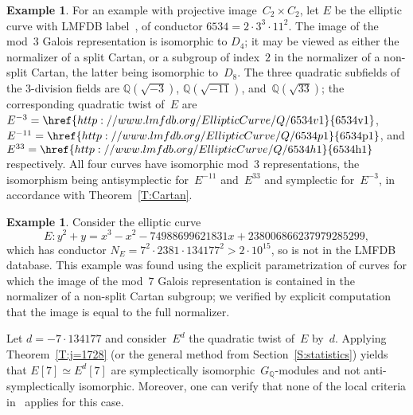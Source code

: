 \documentclass[12pt, reqno]{amsart}
\newcommand{\lmfdbec}[3]{\href{http://www.lmfdb.org/EllipticCurve/Q/#1#2#3}{{\text{\rm#1#2#3}}}}
\newcommand{\Q}{\mathbb{Q}}
\newcommand{\vv}{\upsilon}
\numberwithin{equation}{section}
\theoremstyle{definition}
\newtheorem{example}[theorem]{Example}
\theoremstyle{remark}
\begin{document}
\begin{example} \label{Ex:3twists}
  For an example with projective image~$C_2\times C_2$,
  let $E$ be the elliptic curve with LMFDB label~\lmfdbec{6534}{a}{1},
  of conductor $6534=2\cdot3^3\cdot11^2$.  The image of the mod~$3$
  Galois representation is isomorphic to $D_4$; it may be viewed as
  either the normalizer of a split Cartan, or a subgroup of index~$2$
  in the normalizer of a non-split Cartan, the latter being isomorphic
  to~$D_8$.  The three quadratic subfields of the $3$-division fields
  are $\Q(\sqrt{-3})$, $\Q(\sqrt{-11})$, and~$\Q(\sqrt{33})$; the
  corresponding quadratic twist of~$E$ are
  $E^{-3}=\lmfdbec{6534}{v}{1}$, $E^{-11}=\lmfdbec{6534}{p}{1}$, and
  $E^{33}=\lmfdbec{6534}{h}{1}$ respectively.  All four curves have
  isomorphic mod~$3$ representations, the isomorphism being
  antisymplectic for~$E^{-11}$ and~$E^{33}$ and symplectic
  for~$E^{-3}$, in accordance with Theorem~\ref{T:Cartan}.

\begin{comment}
  \textbf{We no longer need the following, since the new version of
    Theorem~\ref{T:Cartan} says that the symplectic twist is the one
    by $3^*=-3$!}
  
  The conclusion on the symplectic types follows from part 2) of Theorem~\ref{T:Cartan} once we show
  that $E[3]$ and $E^{-3}[3]$ are symplectically isomorphic. We will show this by applying \cite[Theorem~5]{FKSym} with $\ell = 11$. We use the notation of {\it loc. cit.}. Write $E' = E^{-3}$. The curves $E/\Q_{11}$ and $E'/\Q_{11}$ have minimal models satisfying
  \[
  \vv_{11}(\Delta_m) = \vv_{11}(\Delta_m') = 3 \quad \text{ and } \quad \tilde{\Delta} = -1259712, \quad \tilde{\Delta}' = -1728.
  \]
 Thus $e = e' = 4$ by \cite[Proposition~1]{Kraus1990}. 
Moreover, we have $\vv_{11}(\Delta_m) \equiv \vv_{11}(\Delta_m')
\pmod{4}$ and none of $\tilde{\Delta}$, $\tilde{\Delta}'$ is a square mod~$11$. Thus, $r=t=0$ and $E[3]$ and $E'[3]$ are symplectically isomorphic $G_{\Q_{11}}$-modules, hence $E[3]$ and $E'[3]$ are also symplectically isomorphic $G_\Q$-modules.
\end{comment}
\end{example}

\begin{example} \label{Ex:LocalFail7}
Consider the elliptic curve
\[ E : y^2 + y = x^3 - x^2 - 74988699621831x +  238006866237979285299, \]
which has conductor $ N_E = 7^2 \cdot 2381 \cdot
134177^2>2\cdot10^{15}$, so is not in the LMFDB database.  This
example was found using the explicit parametrization of curves for
which the image of the mod~$7$ Galois representation is contained in
the normalizer of a non-split Cartan subgroup; we verified by explicit
computation that the image is equal to the full normalizer.

Let $d = -7 \cdot 134177$ and consider~$E^d$ the quadratic twist
of~$E$ by~$d$. Applying Theorem~\ref{T:j=1728} (or the general method
from Section~\ref{S:statistics}) yields that $E[7] \simeq E^d[7]$ are
symplectically isomorphic~$G_\Q$-modules and not anti-symplectically
isomorphic. Moreover, one can verify that none of the local criteria
in~\cite{FKSym} applies for this case.
\end{example}
\end{document}
